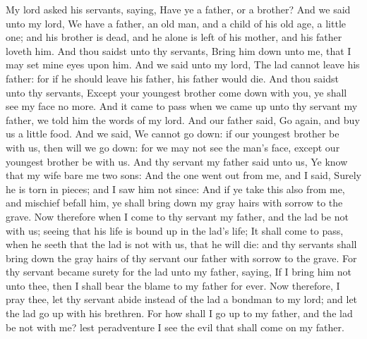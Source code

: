 \begin{biblechapter}
\verse My lord asked his servants, saying, Have ye a father, or a brother?
\verse And we said unto my lord, We have a father, an old man, and a child of his old age, a little one; and his brother is dead, and he alone is left of his mother, and his father loveth him.
\verse And thou saidst unto thy servants, Bring him down unto me, that I may set mine eyes upon him.
\verse And we said unto my lord, The lad cannot leave his father: for if he should leave his father, his father would die.
\verse And thou saidst unto thy servants, Except your youngest brother come down with you, ye shall see my face no more.
\verse And it came to pass when we came up unto thy servant my father, we told him the words of my lord.
\verse And our father said, Go again, and buy us a little food.
\verse And we said, We cannot go down: if our youngest brother be with us, then will we go down: for we may not see the man's face, except our youngest brother be with us.
\verse And thy servant my father said unto us, Ye know that my wife bare me two sons:
\verse And the one went out from me, and I said, Surely he is torn in pieces; and I saw him not since:
\verse And if ye take this also from me, and mischief befall him, ye shall bring down my gray hairs with sorrow to the grave.
\verse Now therefore when I come to thy servant my father, and the lad be not with us; seeing that his life is bound up in the lad's life;
\verse It shall come to pass, when he seeth that the lad is not with us, that he will die: and thy servants shall bring down the gray hairs of thy servant our father with sorrow to the grave.
\verse For thy servant became surety for the lad unto my father, saying, If I bring him not unto thee, then I shall bear the blame to my father for ever.
\verse Now therefore, I pray thee, let thy servant abide instead of the lad a bondman to my lord; and let the lad go up with his brethren.
\verse For how shall I go up to my father, and the lad be not with me? lest peradventure I see the evil that shall come on my father.
\end{biblechapter}

